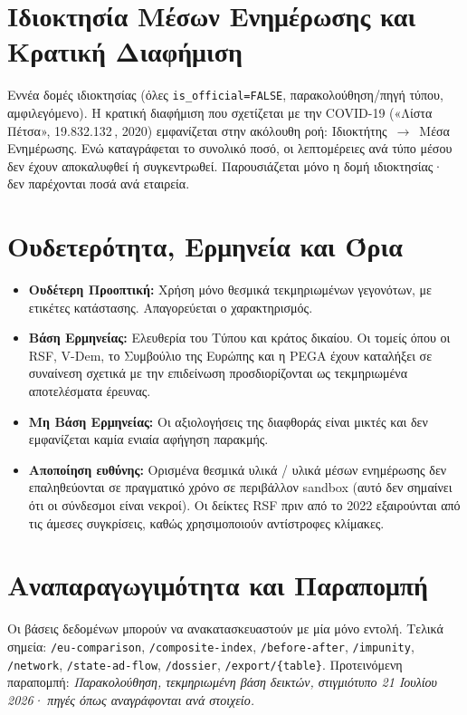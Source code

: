 \documentclass[11pt]{article}
\newcommand{\euro}{\texteuro}
\begin{document}
\section{Ιδιοκτησία Μέσων Ενημέρωσης και Κρατική Διαφήμιση}

Εννέα δομές ιδιοκτησίας (όλες \texttt{is\_official=FALSE}, παρακολούθηση/πηγή
τύπου, αμφιλεγόμενο). Η κρατική διαφήμιση που σχετίζεται με την COVID-19 («Λίστα
Πέτσα», 19.832.132\,\euro, 2020) εμφανίζεται στην ακόλουθη ροή:
Ιδιοκτήτης~$\rightarrow$~Μέσα Ενημέρωσης. Ενώ καταγράφεται το συνολικό ποσό, οι
λεπτομέρειες ανά τύπο μέσου δεν έχουν αποκαλυφθεί ή συγκεντρωθεί. Παρουσιάζεται μόνο
η δομή ιδιοκτησίας· δεν παρέχονται ποσά ανά εταιρεία.

\section{Ουδετερότητα, Ερμηνεία και Όρια}
\begin{itemize}[leftmargin=1.4em,itemsep=1pt]
\item \textbf{Ουδέτερη Προοπτική:} Χρήση μόνο θεσμικά τεκμηριωμένων γεγονότων, με ετικέτες κατάστασης. Απαγορεύεται ο χαρακτηρισμός.
\item \textbf{Βάση Ερμηνείας:} Ελευθερία του Τύπου και κράτος δικαίου. Οι τομείς όπου οι RSF, V-Dem, το Συμβούλιο της Ευρώπης και η PEGA έχουν καταλήξει σε συναίνεση σχετικά με την επιδείνωση προσδιορίζονται ως τεκμηριωμένα αποτελέσματα έρευνας.
\item \textbf{Μη Βάση Ερμηνείας:} Οι αξιολογήσεις της διαφθοράς είναι μικτές και δεν εμφανίζεται καμία ενιαία αφήγηση παρακμής.
\item \textbf{Αποποίηση ευθύνης:} Ορισμένα θεσμικά υλικά / υλικά μέσων ενημέρωσης δεν επαληθεύονται σε πραγματικό χρόνο σε περιβάλλον sandbox (αυτό δεν σημαίνει ότι οι σύνδεσμοι είναι νεκροί). Οι δείκτες RSF πριν από το 2022 εξαιρούνται από τις άμεσες συγκρίσεις, καθώς χρησιμοποιούν αντίστροφες κλίμακες.
\end{itemize}

\section{Αναπαραγωγιμότητα και Παραπομπή}

Οι βάσεις δεδομένων μπορούν να ανακατασκευαστούν με μία μόνο εντολή. Τελικά σημεία:
\texttt{/eu-comparison}, \texttt{/composite-index}, \texttt{/before-after},
\texttt{/impunity}, \texttt{/network}, \texttt{/state-ad-flow}, \texttt{/dossier},
\texttt{/export/\{table\}}. Προτεινόμενη παραπομπή: \emph{Παρακολούθηση, τεκμηριωμένη βάση δεικτών, στιγμιότυπο 21 Ιουλίου 2026· πηγές όπως αναγράφονται ανά
στοιχείο.}
\end{document}
